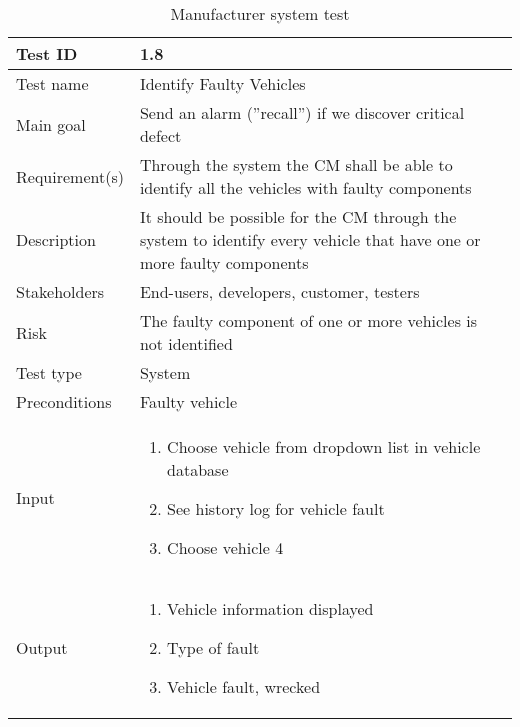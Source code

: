 \begin{table}[H]
\centering
\caption{Manufacturer system test}
\begin{tabularx}{1.0\textwidth}{
    |p{}     %
    |p{}|    %
}
\hline

Test ID
& 1.8
\\
\hline

Test name
& Identify Faulty Vehicles
\\
\hline

Main goal
& Send an alarm (”recall”) if we discover critical defect
\\
\hline

Requirement(s)
& Through the system the CM shall be able to identify all the vehicles with faulty components
\\
\hline

Description
& It should be possible for the CM through the system to identify every vehicle that have one or more faulty components
\\
\hline

Stakeholders
& End-users, developers, customer, testers
\\
\hline

Risk
& The faulty component of one or more vehicles is not identified
\\
\hline

Test type
& System
\\
\hline

Preconditions
& Faulty vehicle
\\
\hline

Input
& \begin{enumerate}
    \item Choose vehicle from dropdown list in vehicle database
    \item See history log for vehicle fault
    \item Choose vehicle 4
\end{enumerate}
\\
\hline

Output
& \begin{enumerate}
    \item Vehicle information displayed
    \item Type of fault
    \item Vehicle fault, wrecked
\end{enumerate}
\\
\hline


\end{tabularx}
\end{table}
